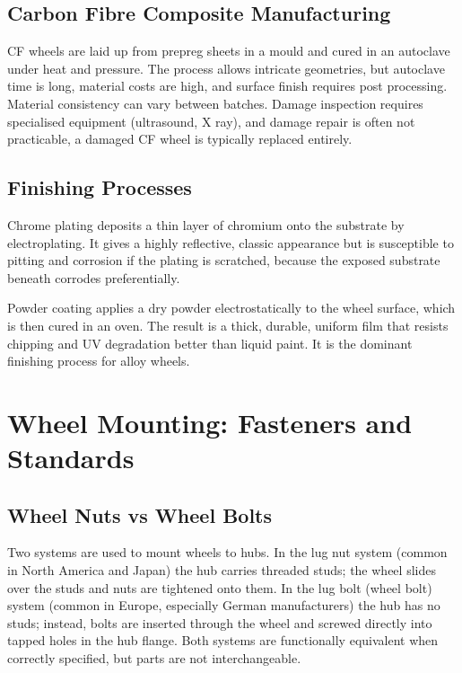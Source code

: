 \documentclass[10pt,a4paper]{article}
\begin{document}
\subsection{Carbon Fibre Composite Manufacturing}

CF wheels are laid up from prepreg sheets in a mould and cured in an autoclave under heat and pressure. The process allows intricate geometries, but autoclave time is long, material costs are high, and surface finish requires post processing. Material consistency can vary between batches. Damage inspection requires specialised equipment (ultrasound, X ray), and damage repair is often not practicable, a damaged CF wheel is typically replaced entirely.

\subsection{Finishing Processes}

Chrome plating deposits a thin layer of chromium onto the substrate by electroplating. It gives a highly reflective, classic appearance but is susceptible to pitting and corrosion if the plating is scratched, because the exposed substrate beneath corrodes preferentially.

Powder coating applies a dry powder electrostatically to the wheel surface, which is then cured in an oven. The result is a thick, durable, uniform film that resists chipping and UV degradation better than liquid paint. It is the dominant finishing process for alloy wheels.

\section{Wheel Mounting: Fasteners and Standards}

\subsection{Wheel Nuts vs Wheel Bolts}

Two systems are used to mount wheels to hubs. In the lug nut system (common in North America and Japan) the hub carries threaded studs; the wheel slides over the studs and nuts are tightened onto them. In the lug bolt (wheel bolt) system (common in Europe, especially German manufacturers) the hub has no studs; instead, bolts are inserted through the wheel and screwed directly into tapped holes in the hub flange. Both systems are functionally equivalent when correctly specified, but parts are not interchangeable.
\end{document}
